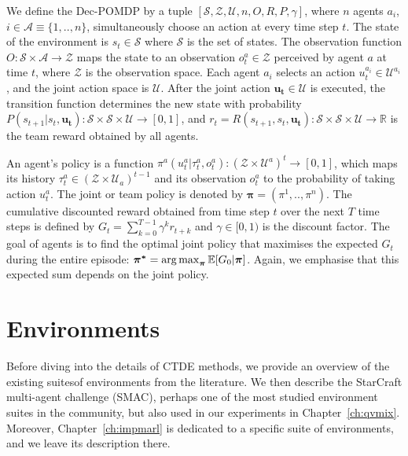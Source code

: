 We define the Dec-POMDP by a tuple $[\mathcal{S}, \mathcal{Z}, \mathcal{U}, n, O, R, P, \gamma]$, where $n$ agents $a_i$, $i \in \mathcal{A} \equiv \{1,..,n\}$, simultaneously choose an action at every time step $t$.
The state of the environment is $s_t \in \mathcal{S}$ where $\mathcal{S}$ is the set of states.
The observation function $O: \mathcal{S} \times \mathcal{A} \rightarrow \mathcal{Z}$ maps the state to an observation $o_t^{a} \in \mathcal{Z}$ perceived by agent $a$ at time $t$, where $\mathcal{Z}$ is the observation space.
Each agent $a_i$ selects an action $u_t^{a_i} \in \mathcal{U}^{a_i}$, and the joint action space is $\mathcal{U}$.
After the joint action $\boldsymbol{u_t} \in \mathcal{U}$ is executed, the transition function determines the new state with probability $P(s_{t+1}|s_t, \boldsymbol{u_t}): \mathcal{S} \times \mathcal{S} \times\mathcal{U} \rightarrow  [0,1] $, and $r_t=R(s_{t+1}, s_t, \boldsymbol {u_t}): \mathcal{S} \times \mathcal{S} \times \mathcal{U} \rightarrow \mathbb{R}$ is the team reward obtained by all agents.

An agent's policy is a function $\pi^{a}(u_t^{a}|\tau_t^{a},o_t^{a}): (\mathcal{Z} \times \mathcal{U}^a)^t \rightarrow [0,1]$, which maps its history $\tau_t^{a} \in (\mathcal{Z} \times \mathcal{U}_a)^{t-1}$ and its observation $o_t^{a}$ to the probability of taking action $u_t^{a}$. 
The joint or team policy is denoted by $\boldsymbol{\pi}=(\pi^1,..,\pi^n)$.
The cumulative discounted reward obtained from time step $t$ over the next $T$ time steps is defined by $G_{t} = \sum_{k=0}^{T-1} \gamma^k r_{t+k}$ and $\gamma \in [0, 1)$ is the discount factor.
The goal of agents is to find the optimal joint policy that maximises the expected $G_t$ during the entire episode: $\boldsymbol{\pi^{*}} =\operatorname*{arg\,max}_{\boldsymbol{\pi}} \mathbb{E}[G_0|\boldsymbol{\pi}]$.
Again, we emphasise that this expected sum depends on the joint policy.



\section{Environments}
\label{sec:ch3_env}
Before diving into the details of CTDE methods, we provide an overview of the existing suites\footnotemark  of environments from the literature.
We then describe the StarCraft multi-agent challenge (SMAC), perhaps one of the most studied environment suites in the community, but also used in our experiments in Chapter~\ref{ch:qvmix}.
Moreover, Chapter~\ref{ch:impmarl} is dedicated to a specific suite of environments, and we leave its description there.

